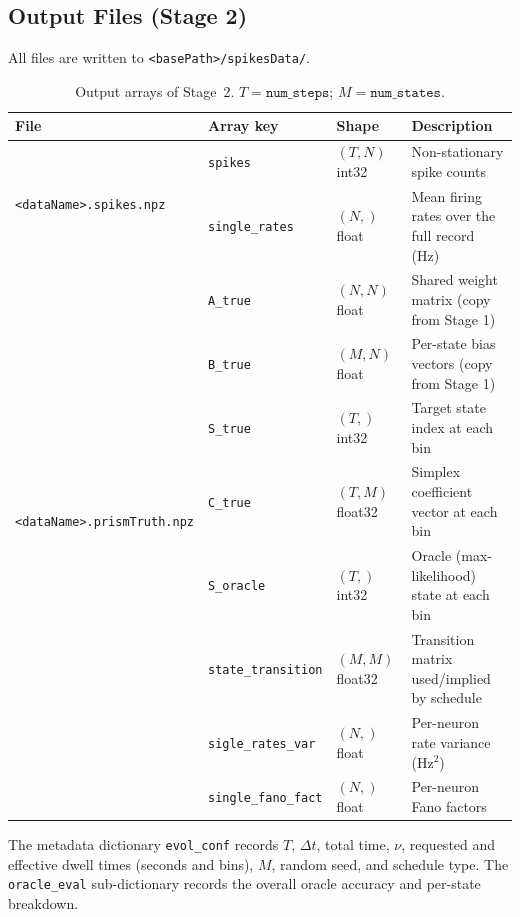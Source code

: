 \documentclass[11pt]{article}
\begin{document}
\subsection{Output Files (Stage 2)}

All files are written to \texttt{<basePath>/spikesData/}.

\begin{table}[h]
\centering
\begin{tabular}{llll}
\toprule
File & Array key & Shape & Description \\
\midrule
\multirow{2}{*}{\texttt{<dataName>.spikes.npz}}
  & \texttt{spikes} & $(T,N)$ int32 &
      Non-stationary spike counts \\
  & \texttt{single\_rates} & $(N,)$ float &
      Mean firing rates over the full record (Hz) \\
\midrule
\multirow{7}{*}{\texttt{<dataName>.prismTruth.npz}}
  & \texttt{A\_true} & $(N,N)$ float &
      Shared weight matrix (copy from Stage 1) \\
  & \texttt{B\_true} & $(M,N)$ float &
      Per-state bias vectors (copy from Stage 1) \\
  & \texttt{S\_true} & $(T,)$ int32 &
      Target state index at each bin \\
  & \texttt{C\_true} & $(T,M)$ float32 &
      Simplex coefficient vector at each bin \\
  & \texttt{S\_oracle} & $(T,)$ int32 &
      Oracle (max-likelihood) state at each bin \\
  & \texttt{state\_transition} & $(M,M)$ float32 &
      Transition matrix used/implied by schedule \\
  & \texttt{sigle\_rates\_var} & $(N,)$ float &
      Per-neuron rate variance (Hz$^2$) \\
  & \texttt{single\_fano\_fact} & $(N,)$ float &
      Per-neuron Fano factors \\
\bottomrule
\end{tabular}
\caption{Output arrays of Stage~2.
  $T = \texttt{num\_steps}$; $M = \texttt{num\_states}$.}
\label{tab:stage2_output}
\end{table}

The metadata dictionary \texttt{evol\_conf} records $T$, $\Delta t$,
total time, $\nu$, requested and effective dwell times (seconds and bins),
$M$, random seed, and schedule type.
The \texttt{oracle\_eval} sub-dictionary records the overall oracle
accuracy and per-state breakdown.

\end{document}
